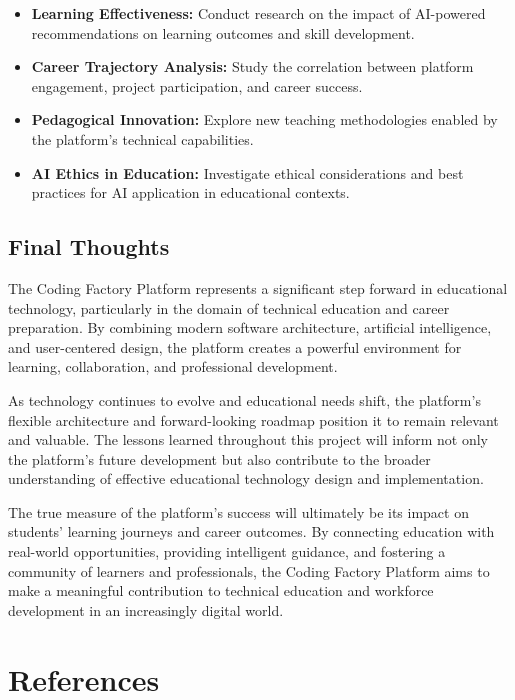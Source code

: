 \documentclass[12pt,a4paper]{report}
\begin{document}
\begin{itemize}
    \item \textbf{Learning Effectiveness:} Conduct research on the impact of AI-powered recommendations on learning outcomes and skill development.

    \item \textbf{Career Trajectory Analysis:} Study the correlation between platform engagement, project participation, and career success.

    \item \textbf{Pedagogical Innovation:} Explore new teaching methodologies enabled by the platform's technical capabilities.

    \item \textbf{AI Ethics in Education:} Investigate ethical considerations and best practices for AI application in educational contexts.
\end{itemize}

\section{Final Thoughts}

The Coding Factory Platform represents a significant step forward in educational technology, particularly in the domain of technical education and career preparation. By combining modern software architecture, artificial intelligence, and user-centered design, the platform creates a powerful environment for learning, collaboration, and professional development.

As technology continues to evolve and educational needs shift, the platform's flexible architecture and forward-looking roadmap position it to remain relevant and valuable. The lessons learned throughout this project will inform not only the platform's future development but also contribute to the broader understanding of effective educational technology design and implementation.

The true measure of the platform's success will ultimately be its impact on students' learning journeys and career outcomes. By connecting education with real-world opportunities, providing intelligent guidance, and fostering a community of learners and professionals, the Coding Factory Platform aims to make a meaningful contribution to technical education and workforce development in an increasingly digital world.

\chapter{References}
\end{document}
